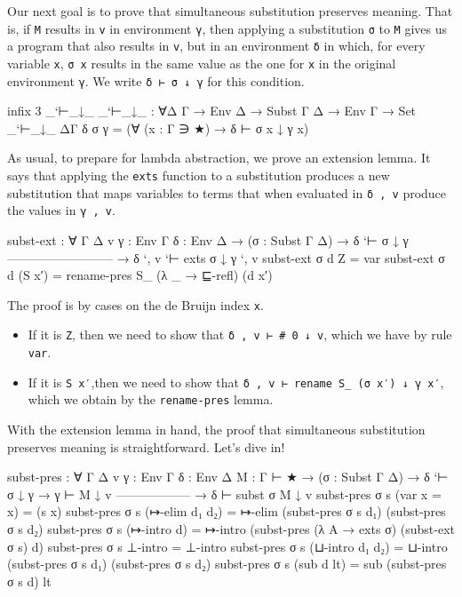 Our next goal is to prove that simultaneous substitution preserves
meaning. That is, if \texttt{M} results in \texttt{v} in environment
\texttt{γ}, then applying a substitution \texttt{σ} to \texttt{M} gives
us a program that also results in \texttt{v}, but in an environment
\texttt{δ} in which, for every variable \texttt{x}, \texttt{σ\ x}
results in the same value as the one for \texttt{x} in the original
environment \texttt{γ}. We write \texttt{δ\ ⊢\ σ\ ↓\ γ} for this
condition.

\begin{fence}
\begin{code}
infix 3 _`⊢_↓_
_`⊢_↓_ : ∀{Δ Γ} → Env Δ → Subst Γ Δ → Env Γ → Set
_`⊢_↓_ {Δ}{Γ} δ σ γ = (∀ (x : Γ ∋ ★) → δ ⊢ σ x ↓ γ x)
\end{code}
\end{fence}

As usual, to prepare for lambda abstraction, we prove an extension
lemma. It says that applying the \texttt{exts} function to a
substitution produces a new substitution that maps variables to terms
that when evaluated in \texttt{δ\ ,\ v} produce the values in
\texttt{γ\ ,\ v}.

\begin{fence}
\begin{code}
subst-ext : ∀ {Γ Δ v} {γ : Env Γ} {δ : Env Δ}
  → (σ : Subst Γ Δ)
  → δ `⊢ σ ↓ γ
   --------------------------
  → δ `, v `⊢ exts σ ↓ γ `, v
subst-ext σ d Z = var
subst-ext σ d (S x′) = rename-pres S_ (λ _ → ⊑-refl) (d x′)
\end{code}
\end{fence}

The proof is by cases on the de Bruijn index \texttt{x}.

\begin{itemize}
\item
  If it is \texttt{Z}, then we need to show that
  \texttt{δ\ ,\ v\ ⊢\ \#\ 0\ ↓\ v}, which we have by rule \texttt{var}.
\item
  If it is \texttt{S\ x′},then we need to show that
  \texttt{δ\ ,\ v\ ⊢\ rename\ S\_\ (σ\ x′)\ ↓\ γ\ x′}, which we obtain
  by the \texttt{rename-pres} lemma.
\end{itemize}

With the extension lemma in hand, the proof that simultaneous
substitution preserves meaning is straightforward. Let's dive in!

\begin{fence}
\begin{code}
subst-pres : ∀ {Γ Δ v} {γ : Env Γ} {δ : Env Δ} {M : Γ ⊢ ★}
  → (σ : Subst Γ Δ)
  → δ `⊢ σ ↓ γ
  → γ ⊢ M ↓ v
    ------------------
  → δ ⊢ subst σ M ↓ v
subst-pres σ s (var {x = x}) = (s x)
subst-pres σ s (↦-elim d₁ d₂) =
  ↦-elim (subst-pres σ s d₁) (subst-pres σ s d₂)
subst-pres σ s (↦-intro d) =
  ↦-intro (subst-pres (λ {A} → exts σ) (subst-ext σ s) d)
subst-pres σ s ⊥-intro = ⊥-intro
subst-pres σ s (⊔-intro d₁ d₂) =
  ⊔-intro (subst-pres σ s d₁) (subst-pres σ s d₂)
subst-pres σ s (sub d lt) = sub (subst-pres σ s d) lt
\end{code}
\end{fence}


